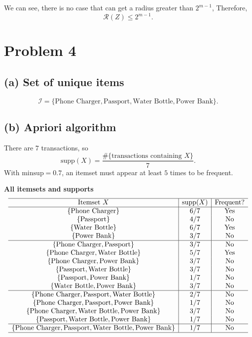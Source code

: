 \documentclass[fleqn]{article}
\begin{document}
    \noindent We can see, there is no case that can get a radius greater than $2^{m-1}$, Therefore,
    \[
    \mathcal{R}(Z)\le 2^{m-1}.
    \]

    \section{Problem 4}
    \subsection{(a) Set of unique items}
    \[
    \mathcal{I} = \{\text{Phone Charger}, \text{Passport}, \text{Water Bottle}, \text{Power Bank}\}.
    \]

    \subsection{(b) Apriori algorithm}
    \noindent There are $7$ transactions, so
    \[
    \mathrm{supp}(X)=\frac{\#\{\text{transactions containing }X\}}{7}.
    \]
    With $\mathrm{minsup}=0.7$, an itemset must appear at least $5$ times to be frequent.

    \medskip
    \noindent \textbf{All itemsets and supports}
    \[
    \begin{array}{c|c|c}
        \hline
        \text{Itemset } X & \mathrm{supp}(X) & \text{Frequent?} \\
        \hline
        \{\text{Phone Charger}\} & 6/7 & \text{Yes} \\
        \{\text{Passport}\} & 4/7 & \text{No} \\
        \{\text{Water Bottle}\} & 6/7 & \text{Yes} \\
        \{\text{Power Bank}\} & 3/7 & \text{No} \\
        \hline
        \{\text{Phone Charger},\text{Passport}\} & 3/7 & \text{No} \\
        \{\text{Phone Charger},\text{Water Bottle}\} & 5/7 & \text{Yes} \\
        \{\text{Phone Charger},\text{Power Bank}\} & 3/7 & \text{No} \\
        \{\text{Passport},\text{Water Bottle}\} & 3/7 & \text{No} \\
        \{\text{Passport},\text{Power Bank}\} & 1/7 & \text{No} \\
        \{\text{Water Bottle},\text{Power Bank}\} & 3/7 & \text{No} \\
        \hline
        \{\text{Phone Charger},\text{Passport},\text{Water Bottle}\} & 2/7 & \text{No} \\
        \{\text{Phone Charger},\text{Passport},\text{Power Bank}\} & 1/7 & \text{No} \\
        \{\text{Phone Charger},\text{Water Bottle},\text{Power Bank}\} & 3/7 & \text{No} \\
        \{\text{Passport},\text{Water Bottle},\text{Power Bank}\} & 1/7 & \text{No} \\
        \hline
        \{\text{Phone Charger},\text{Passport},\text{Water Bottle},\text{Power Bank}\} & 1/7 & \text{No} \\
        \hline
    \end{array}
    \]
\end{document}
